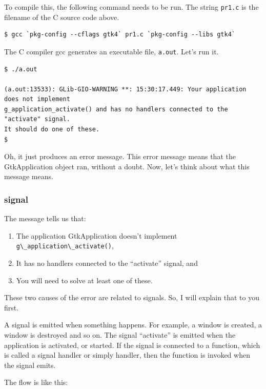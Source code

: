 To compile this, the following command needs to be run. The string
\passthrough{\lstinline!pr1.c!} is the filename of the C source code
above.

\begin{lstlisting}
$ gcc `pkg-config --cflags gtk4` pr1.c `pkg-config --libs gtk4`
\end{lstlisting}

The C compiler gcc generates an executable file,
\passthrough{\lstinline!a.out!}. Let's run it.

\begin{lstlisting}
$ ./a.out

(a.out:13533): GLib-GIO-WARNING **: 15:30:17.449: Your application does not implement
g_application_activate() and has no handlers connected to the "activate" signal.
It should do one of these.
$
\end{lstlisting}

Oh, it just produces an error message. This error message means that the
GtkApplication object ran, without a doubt. Now, let's think about what
this message means.

\hypertarget{signal}{%
\subsubsection{signal}\label{signal}}

The message tells us that:

\begin{enumerate}
\def\labelenumi{\arabic{enumi}.}
\tightlist
\item
  The application GtkApplication doesn't implement
  \passthrough{\lstinline!g\_application\_activate()!},
\item
  It has no handlers connected to the ``activate'' signal, and
\item
  You will need to solve at least one of these.
\end{enumerate}

These two causes of the error are related to signals. So, I will explain
that to you first.

A signal is emitted when something happens. For example, a window is
created, a window is destroyed and so on. The signal ``activate'' is
emitted when the application is activated, or started. If the signal is
connected to a function, which is called a signal handler or simply
handler, then the function is invoked when the signal emits.

The flow is like this:

